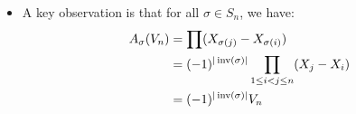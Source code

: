 \begin{itemize}
\begin{enumerate}
            \item For all $\sigma,\tau \in S_n$, we have:
            \begin{equation}
                A_{\sigma\tau} = A_\sigma \circ A_\tau
            \end{equation}
            \begin{proof}
                Let $P = \sum_{i_1,\dots,i_n} a_{i_1,\dots,i_n} X_1^{i_1}\cdots X_n^{i_n}$ be an arbitrary element of $\mathbb{C}[x_1,\dots,x_n]$. Then:
                \begin{align}
                    A_\sigma(A_\tau(P)) &= A_\sigma \left(\sum_{i_1,\dots, i_n \ge 0} a_{i_1,\dots,i_n} X_{\tau(1)}^{i_1}\cdots X_{\tau(n)}^{i_n}\right) \\ 
                    &= \sum_{i_1,\dots,i_n}\ge 0 a_{i_1,\dots, i_n \ge 0}a_{i_1,\dots,i_n} A_\sigma(X_\tau(1)^{i_1}) \cdots A_\sigma(X_{\tau(n)}^{i_n}) \\ 
                    &= A_{\sigma\tau}(P)
                \end{align}
            \end{proof}
    \end{enumerate}
    \begin{definition}
        The Vandermonde polynomial in $\mathbb{C}[X_1,\dots,X_n]$ is the polynomial $V_n = \prod {1\le i < j \le n} (X_j - X_i)$.
    \end{definition}
    \item A key observation is that for all $\sigma \in S_n$, we have:
    \begin{align}
        A_\sigma(V_n) &= \prod (X_{\sigma(j)} - X_{\sigma(i)}) \\ 
        &= (-1)^{|\operatorname{inv}(\sigma)|} \prod_{1\le i < j \le n} (X_j-X_i) \\ 
        &= (-1)^{|\operatorname{inv}(\sigma)|} V_n
    \end{align}
\end{itemize}